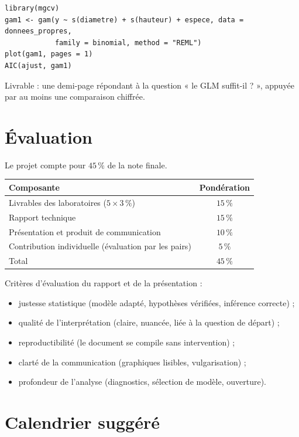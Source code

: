 \documentclass[11pt,letterpaper]{scrartcl}
\begin{document}
\begin{lstlisting}
library(mgcv)
gam1 <- gam(y ~ s(diametre) + s(hauteur) + espece, data = donnees_propres,
            family = binomial, method = "REML")
plot(gam1, pages = 1)
AIC(ajust, gam1)
\end{lstlisting}

Livrable : une demi-page répondant à la question « le GLM suffit-il ? », appuyée par au moins une comparaison chiffrée.

\section{Évaluation}

Le projet compte pour $45\,\%$ de la note finale.

\begin{center}
\begin{tabular}{@{}lc@{}}
\toprule
Composante & Pondération \\
\midrule
Livrables des laboratoires ($5 \times 3\,\%$) & $15\,\%$ \\
Rapport technique & $15\,\%$ \\
Présentation et produit de communication & $10\,\%$ \\
Contribution individuelle (évaluation par les pairs) & $5\,\%$ \\
\midrule
Total & $45\,\%$ \\
\bottomrule
\end{tabular}
\end{center}

Critères d'évaluation du rapport et de la présentation :
\begin{itemize}
  \item justesse statistique (modèle adapté, hypothèses vérifiées, inférence correcte) ;
  \item qualité de l'interprétation (claire, nuancée, liée à la question de départ) ;
  \item reproductibilité (le document se compile sans intervention) ;
  \item clarté de la communication (graphiques lisibles, vulgarisation) ;
  \item profondeur de l'analyse (diagnostics, sélection de modèle, ouverture).
\end{itemize}

\section{Calendrier suggéré}
\end{document}
